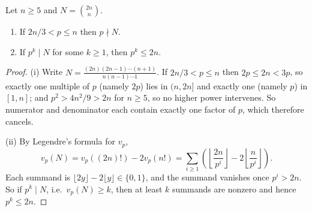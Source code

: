 \documentclass[a4paper]{scrartcl}
\begin{document}
\begin{lemma}\label{lem:binom}
	Let $n \geq 5$ and $N = \binom{2n}n$.
	\begin{enumerate}[label=(\roman*)]
		\item If $2n/3 < p \leq n$ then $p \nmid N$.
		\item If $p^k \mid N$ for some $k \geq 1$, then $p^k \leq 2n$.
	\end{enumerate}
\end{lemma}
\begin{proof}
	(i) Write $N = \frac{(2n)(2n-1)\cdots(n+1)}{n(n-1)\cdots1}$. If $2n/3 < p \leq n$ then $2p \leq 2n < 3p$, so exactly one multiple of $p$ (namely $2p$) lies in $(n, 2n]$ and exactly one (namely $p$) in $[1,n]$; and $p^2 > 4n^2/9 > 2n$ for $n \geq 5$, so no higher power intervenes. So numerator and denominator each contain exactly one factor of $p$, which therefore cancels.

	(ii) By Legendre's formula for $v_p$,
	$$
	v_p(N) = v_p((2n)!) - 2v_p(n!) = \sum_{i \geq 1}\left(\left\lfloor\frac{2n}{p^i}\right\rfloor - 2\left\lfloor\frac n{p^i}\right\rfloor\right).
	$$
	Each summand is $\lfloor 2y \rfloor - 2\lfloor y\rfloor \in \{0, 1\}$, and the summand vanishes once $p^i > 2n$. So if $p^k \mid N$, i.e.\ $v_p(N) \geq k$, then at least $k$ summands are nonzero and hence $p^k \leq 2n$.
\end{proof}
\end{document}
